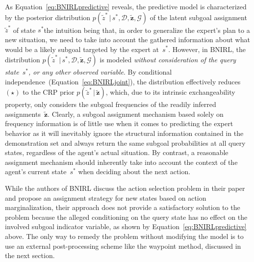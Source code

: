 \documentclass[twoside,11pt]{article}
\newcommand{\p}{p}
\newcommand{\given}{\,\vert\,}
\newcommand{\nachschub}[1]{\Emdash*#1}
\begin{document}
As Equation~\eqref{eq:BNIRLpredictive} reveals, the predictive model is characterized by the posterior distribution $\p(\tilde{z}^* \given s^*,\mathcal{D},\mathbf{\tilde{z}},\mathcal{G})$ of the latent subgoal assignment $\tilde{z}^*$ of state $s^*$\nachschub{the intuition being that, in order to generalize the expert's plan to a new situation, we need %
to %
%
take into account the gathered information about what would be a likely subgoal targeted by the expert at~$s^*$.} %
%
%
However, in BNIRL, %
the %
distribution 
$\p(\tilde{z}^* \given s^*,\mathcal{D},\mathbf{\tilde{z}},\mathcal{G})$ is modeled \textit{without consideration of the query state~$s^*$, or any other observed variable}. %
By conditional independence~(Equation~\ref{eq:BNIRLjoint}),
the distribution effectively reduces~$(\star)$ to the CRP prior $\p(\tilde{z}^* \given \mathbf{\tilde{z}})$, which, due to its intrinsic exchangeability property, only considers the subgoal frequencies of the readily inferred %
assignments~$\mathbf{\tilde{z}}$. 
Clearly, a subgoal assignment mechanism %
%
based solely on
%
%
frequency information is of little use when it comes to predicting the expert behavior %
as it 
%
%
will inevitably  ignore the %
%
%
structural information contained in the demonstration set
%
%
and %
always return the same subgoal probabilities %
at all query states, regardless of the agent's actual 
situation. %
%
By contrast, a reasonable %
assignment mechanism should inherently take into account the context of the agent's current state~$s^*$ 
%
when deciding about the next action. %

While the authors of BNIRL %
discuss the action selection problem in their paper and propose %
an assignment strategy for new states based on action marginalization, their approach does not provide a satisfactory solution to the problem
%
because the alleged conditioning on the query state \citep[see Equation~19 in the original paper,][]{michini2012bayesian} has no %
effect on the involved subgoal indicator variable, as shown by Equation~\eqref{eq:BNIRLpredictive} above. %
%
%
%
The only way to remedy the problem without modifying the model is to use an external post-processing scheme like the waypoint method, %
%
%
%
discussed in the next section.












\end{document}
